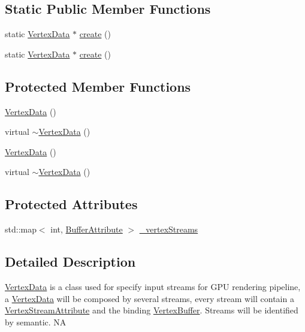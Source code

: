 \subsection*{Static Public Member Functions}
\begin{DoxyCompactItemize}
\item 
static \hyperlink{classVertexData}{Vertex\+Data} $\ast$ \hyperlink{classVertexData_ad87e3c945044fac9f2cef09317fb9ccb}{create} ()
\item 
static \hyperlink{classVertexData}{Vertex\+Data} $\ast$ \hyperlink{classVertexData_af77ed761106e9859e52add75359d3387}{create} ()
\end{DoxyCompactItemize}
\subsection*{Protected Member Functions}
\begin{DoxyCompactItemize}
\item 
\hyperlink{classVertexData_ad1c08dd6d476cbcb834f74a101591460}{Vertex\+Data} ()
\item 
virtual \hyperlink{classVertexData_a90be443368ca95a4dd4eec5a66f788b3}{$\sim$\+Vertex\+Data} ()
\item 
\hyperlink{classVertexData_ad1c08dd6d476cbcb834f74a101591460}{Vertex\+Data} ()
\item 
virtual \hyperlink{classVertexData_acc9d1644da6e2b00f81c8bac1cd06960}{$\sim$\+Vertex\+Data} ()
\end{DoxyCompactItemize}
\subsection*{Protected Attributes}
\begin{DoxyCompactItemize}
\item 
std\+::map$<$ int, \hyperlink{structVertexData_1_1BufferAttribute}{Buffer\+Attribute} $>$ \hyperlink{classVertexData_ade96e434961d895eb540ffb4547c5e32}{\+\_\+vertex\+Streams}
\end{DoxyCompactItemize}


\subsection{Detailed Description}
\hyperlink{classVertexData}{Vertex\+Data} is a class used for specify input streams for G\+PU rendering pipeline, a \hyperlink{classVertexData}{Vertex\+Data} will be composed by several streams, every stream will contain a \hyperlink{structVertexStreamAttribute}{Vertex\+Stream\+Attribute} and the binding \hyperlink{classVertexBuffer}{Vertex\+Buffer}. Streams will be identified by semantic.  NA 

